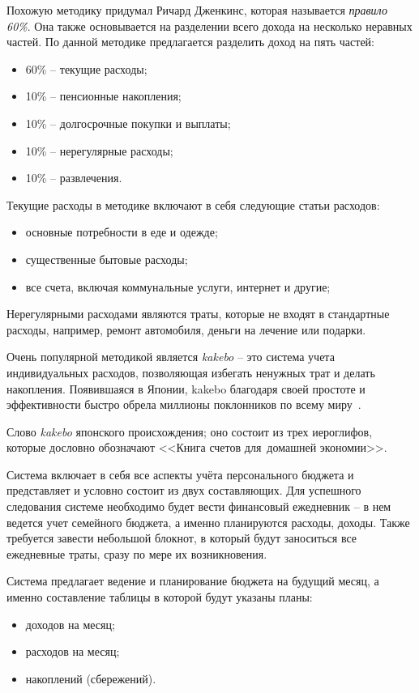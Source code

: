 Похожую методику придумал Ричард Дженкинс, которая называется \emph{правило 60\%}.
Она также основывается на разделении всего дохода на несколько неравных частей.
По данной методике предлагается разделить доход на пять частей:
\begin{itemize}
    \item 60\% -- текущие расходы;
    \item 10\% -- пенсионные накопления;
    \item 10\% -- долгосрочные покупки и выплаты;
    \item 10\% -- нерегулярные расходы;
    \item 10\% -- развлечения.
\end{itemize}

Текущие расходы в методике включают в себя следующие статьи расходов:
\begin{itemize}
    \item основные потребности в еде и одежде;
    \item существенные бытовые расходы;
    \item все счета, включая коммунальные услуги, интернет и другие;
\end{itemize}

Нерегулярными расходами являются траты, которые не входят в стандартные расходы, например, ремонт автомобиля, деньги на лечение или подарки.

Очень популярной методикой является \emph{kakebo} -- это система учета индивидуальных расходов, позволяющая избегать ненужных трат и делать накопления.
Появившаяся в Японии, kakebo благодаря своей простоте и эффективности быстро обрела миллионы поклонников по всему миру~\cite{kakebo}.

Слово \emph{kakebo} японского происхождения; оно состоит из трех иероглифов, которые дословно обозначают <<Книга счетов для домашней экономии>>.

Система включает в себя все аспекты учёта персонального бюджета и представляет и условно состоит из двух составляющих.
Для успешного следования системе необходимо будет вести финансовый ежедневник -- в нем ведется учет семейного бюджета, а именно планируются расходы, доходы.
Также требуется завести небольшой блокнот, в который будут заноситься все ежедневные траты, сразу по мере их возникновения.

Система предлагает ведение и планирование бюджета на будущий месяц, а именно составление таблицы в которой будут указаны планы:
\begin{itemize}
    \item доходов на месяц;
    \item расходов на месяц;
    \item накоплений (сбережений).
\end{itemize}

